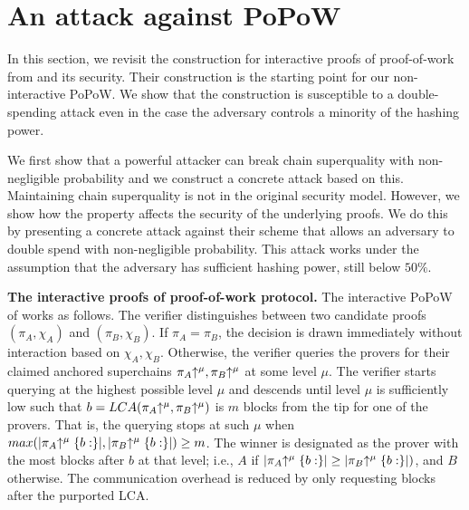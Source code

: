 \section{An attack against PoPoW}

In this section, we revisit the construction for interactive proofs of
proof-of-work from \cite{KLS} and its security.  Their construction is the
starting point for our non-interactive PoPoW. We show that the
construction is susceptible to  a double-spending attack even in the case the
adversary controls a minority of the hashing power.

We first show that a powerful attacker can break chain superquality with
non-negligible probability and we construct a concrete attack based on this.
Maintaining chain superquality is not in the original security model. However,
we show how the property affects the security of the underlying proofs. We do
this by presenting a concrete attack against their scheme that allows an
adversary to double spend with non-negligible probability. This attack works
under the assumption that the adversary has sufficient hashing power, still
below $50\%$.

\noindent
\textbf{The interactive proofs of proof-of-work protocol.}
The interactive PoPoW of \cite{KLS} works as follows. The verifier distinguishes
between two candidate proofs $(\pi_A, \chi_A)$ and $(\pi_B, \chi_B)$. If $\pi_A =
\pi_B$, the decision is drawn immediately without interaction based on
$\chi_A,\chi_B$. Otherwise, the verifier queries the provers for their claimed
anchored superchains $\pi_A\negthickspace\uparrow^\mu, \pi_B\negthickspace\uparrow^\mu$ at some level $\mu$.
The verifier starts querying at the highest possible level $\mu$ and descends
until level $\mu$ is sufficiently low such that $b = LCA(\pi_A\negthickspace\uparrow^\mu,
\pi_B\negthickspace\uparrow^\mu)$ is $m$ blocks from the tip for one of the provers. That is,
the querying stops at such $\mu$ when $max(|\pi_A\negthickspace\uparrow^\mu\{b:\}|,
|\pi_B\negthickspace\uparrow^\mu\{b:\}|) \geq m$. The winner is designated as the prover with
the most blocks after $b$ at that level; i.e., $A$ if $|\pi_A\negthickspace\uparrow^\mu\{b:\}|
\geq |\pi_B\negthickspace\uparrow^\mu\{b:\}|)$, and $B$ otherwise. The communication overhead
is reduced by only requesting blocks after the purported LCA.

